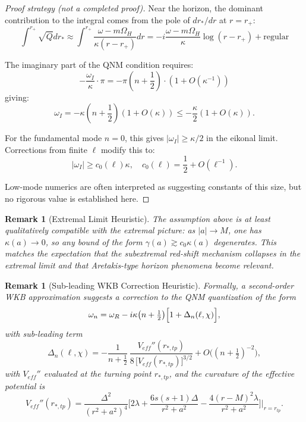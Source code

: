 \documentclass[12pt,a4paper]{article}
\newtheorem{remark}[theorem]{Remark}
\begin{document}
\begin{proof}[Proof strategy (not a completed proof)]
Near the horizon, the dominant contribution to the integral comes from the pole of $dr_*/dr$ at $r = r_+$:
\begin{equation}
\int^{r_+} \sqrt{Q} dr_* \approx \int^{r_+} \frac{\omega - m\Omega_H}{\kappa(r-r_+)} dr = -i\frac{\omega - m\Omega_H}{\kappa}\log(r-r_+) + \text{regular}
\end{equation}

The imaginary part of the QNM condition requires:
\begin{equation}
-\frac{\omega_I}{\kappa} \cdot \pi = -\pi\left(n + \frac{1}{2}\right) \cdot (1 + O(\kappa^{-1}))
\end{equation}
giving:
\begin{equation}
\omega_I = -\kappa\left(n + \frac{1}{2}\right)(1 + O(\kappa)) \leq -\frac{\kappa}{2}(1 + O(\kappa)).
\end{equation}

For the fundamental mode $n=0$, this gives $|\omega_I| \geq \kappa/2$ in the eikonal limit. Corrections from finite $\ell$ modify this to:
\begin{equation}
|\omega_I| \geq c_0(\ell) \kappa, \quad c_0(\ell) = \frac{1}{2} + O(\ell^{-1}).
\end{equation}

Low-mode numerics are often interpreted as suggesting constants of this size, but no rigorous value is established here.
\end{proof}

\begin{remark}[Extremal Limit Heuristic]
The assumption above is at least qualitatively compatible with the extremal picture: as $|a| \to M$, one has $\kappa(a) \to 0$, so any bound of the form $\gamma(a) \gtrsim c_0\kappa(a)$ degenerates. This matches the expectation that the subextremal red-shift mechanism collapses in the extremal limit and that Aretakis-type horizon phenomena become relevant.
\end{remark}

\begin{remark}[Sub-leading WKB Correction Heuristic]\label{prop:WKB-correction}
Formally, a second-order WKB approximation suggests a correction to the QNM quantization of the form
\begin{equation}\label{eq:WKB-subleading}
\omega_n = \omega_R - i\kappa\!\left(n + \tfrac{1}{2}\right)\!\Bigl[1 + \Delta_n(\ell,\chi)\Bigr],
\end{equation}
with sub-leading term
\begin{equation}
\Delta_n(\ell,\chi) = -\frac{1}{n+\tfrac{1}{2}}\,
\frac{V_{eff}''(r_{*,tp})}{8\,\bigl[V_{eff}(r_{*,tp})\bigr]^{3/2}}
  + O\!\bigl((n+\tfrac{1}{2})^{-2}\bigr),
\end{equation}
with $V_{eff}''$ evaluated at the turning point $r_{*,tp}$, and the curvature of the effective potential is
\begin{equation}
V_{eff}''(r_{*,tp}) = \frac{\Delta^2}{(r^2+a^2)^4}\biggl[
  2\lambda + \frac{6s(s+1)\Delta}{r^2+a^2}
  - \frac{4(r-M)^2\lambda}{r^2+a^2}
\biggr]\bigg|_{r=r_{tp}}.
\end{equation}
\end{remark}
\end{document}
